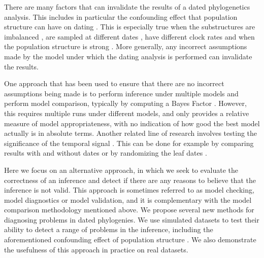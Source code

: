 \documentclass{article}
\begin{document}
There are many factors that can invalidate the results of a dated phylogenetics analysis.
This includes in particular the confounding effect that population structure can have on dating 
\citep{Duchene2015a,Murray2016}. This is especially true when the substructures are 
imbalanced \citep{ducheneTreeImbalanceCauses2015}, are sampled
at different dates \citep{tongComparisonMethodsEstimating2018}, have different clock rates
\citep{wertheimInconsistenciesEstimatingAge2012}  and when the population structure is strong 
\citep{navascuesElevatedSubstitutionRate2009}. 
More generally, any incorrect assumptions made by the model under which the dating analysis is performed
can invalidate the results.

One approach that has been used to ensure that there are no incorrect assumptions being made 
is to perform inference under multiple models and perform model comparison,
typically by computing a Bayes Factor \citep{Baele2012,Li2012,bouckaertBModelTestBayesianPhylogenetic2017}. 
However, this requires multiple runs under different models, and only provides a relative measure
of model appropriateness, with no indication of how good the best model actually is in absolute terms.
Another related line of research involves testing the significance of the temporal signal 
\citep{Duchene2015a,Duchene2020}. This can be done for example by 
comparing results with and without dates \citep{Rambaut2000} or by 
randomizing the leaf dates \citep{Duchene2015a}. 

Here we focus on an alternative approach, in which we seek to evaluate
the correctness of an inference and detect if there are any reasons to believe that the inference is not valid.
This approach is sometimes referred to as model checking, model diagnostics or model validation, 
and it is complementary with the model comparison methodology mentioned above. 
We propose several new methods for diagnosing problems in dated phylogenies.
We use simulated datasets to test their ability to detect a range of problems
in the inference, including the aforementioned confounding effect of population structure
\citep{Murray2016}. 
We also demonstrate the usefulness of this approach in practice on real datasets.
\end{document}
